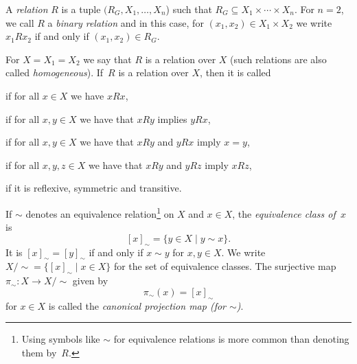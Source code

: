 
 \label{def:relation}
A \emph{relation} $R$ is a tuple $(R_G, X_1, \ldots, X_n$)
such that $R_G \subseteq X_1 \times \cdots \times X_n$.
For $n = 2$, we call $R$ a \emph{binary relation}
and in this case, for $(x_1, x_2) \in X_1 \times X_2$
we write $x_1 R x_2$ if and only if $(x_1, x_2) \in R_G$.

For $X = X_1 = X_2$ we say that $R$ is a relation over $X$ (such relations are also called \emph{homogeneous}). 
If~$R$ is a relation over $X$,
then it is called
\begin{description}  
	
	\item[\normalfont{\emph{reflexive}}] if for all $x \in X$ we have $xRx$,
	
	\item[\normalfont{\emph{symmetric}}] if for all $x,y \in X$ we have that $xRy$ implies $yRx$, 
	
	\item[\normalfont{\emph{antisymmetric}}] if for all $x,y \in X$ we have that $xRy$ and $yRx$ imply $x = y$, 
	
	\item[\normalfont{\emph{transitive}}] if for all $x,y,z \in X$ we have that $xRy$ and $yRz$ imply $xRz$,
	
	\item[\normalfont{\emph{equivalence relation}}] if it is reflexive, symmetric and transitive. 
\end{description}

\label{def:eqfactor}
If $\sim$ denotes an equivalence relation\footnote{Using symbols like $\sim$ for equivalence relations is more common than denoting them by~$R$.}
on $X$ and $x \in X$,
the \emph{equivalence class of~$x$} is 
\[
[x]_{\sim} = \{ y \in X \mid y \sim x \}. \label{def:equivalenceclasses}
\]
It is $[x]_{\sim} = [y]_{\sim}$ if and only if $x \sim y$ for $x,y \in X$.
We write $X / {\sim} = \{ [x]_{\sim} \mid x \in X \}$ 
for the set of equivalence classes. The surjective map $\pi_{\sim} \colon X \to X / {\sim}$ given by
\begin{equation} \label{def:canprojmap}
 \pi_{\sim}(x) = [x]_{\sim}
\end{equation}
for $x \in X$ is called the \emph{canonical projection map (for $\sim$)}. 

